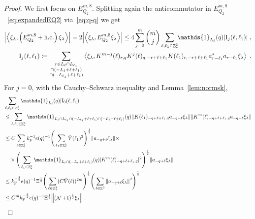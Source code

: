 \documentclass[12pt,a4paper]{article}
\numberwithin{equation}{section}
\newcommand{\1}{\mathbb{I}}
\newcommand{\F}{\mathrm{F}}
\newcommand{\I}{\mathrm{I}}
\DeclareMathOperator{\Z}{\mathbb{Z}}
\DeclareMathOperator{\NN}{\mathcal{N}}
\newcommand{\half}{\frac{1}{2}}
\newcommand{\eva}[1]{\left\langle #1 \right\rangle}
\theoremstyle{plain}
\theoremstyle{definition}
\theoremstyle{remark}
\theoremstyle{plain}
\theoremstyle{definition}
\theoremstyle{remark}
\begin{document}
\begin{proof}
We first focus on $ E^{m,8}_{Q_2} $.
Splitting again the anticommutator in $ E^{m,8}_{Q_2} $~\eqref{eq:expandedEQ2} via~\eqref{eq:q-q} we get
\begin{equation} \label{eq:EQ2181}
\begin{aligned}
	\abs{\eva{\xi_\lambda,\left(E^{m,8}_{Q_2}+\mathrm{h.c.}\right) \xi_\lambda }} 
	= 2\abs{\eva{\xi_\lambda, E^{m,8}_{Q_2} \xi_\lambda }}
	\le 4 \sum_{j=0}^m {{m}\choose j} \sum\limits_{\ell,\ell_1 \in \Z^3_*}\!\! \mathds{1}_{L_\ell}(q) |\I_j(\ell, \ell_1)| \;,\\
	\I_j(\ell, \ell_1)
	\coloneq \sum\limits_{\substack{r\in L_{\ell} \cap L_{\ell_1}\\\cap (-L_{\ell}+\ell+\ell_1) \\ \cap (-L_{\ell_1}+\ell+\ell_1)}}
		\eva{\xi_\lambda, K^{m-j}(\ell)_{r,q} K^{j}(\ell)_{q,-r+\ell+\ell_1} K(\ell_1)_{r,-r+\ell+\ell_1} a^*_{r-\ell_1} a_{r-\ell_1} \xi_\lambda} \;. \\
\end{aligned}
\end{equation}
For $ j = 0 $, with the Cauchy--Schwarz inequality and Lemma~\ref{lem:normsk},
\textcolor{green!30!black}{
\begin{align}
	&\sum_{\ell,\ell_1 \in \Z^3_*} \mathds{1}_{L_\ell}(q) |\I_0(\ell, \ell_1)| \nonumber\\
	&\leq \sum_{\ell,\ell_1 \in \Z^3_*} \mathds{1}_{L_\ell \cap L_{\ell_1} \cap (-L_{\ell_1} + \ell + \ell_1) \cap (-L_\ell + \ell + \ell_1)}(q)
		\norm{ K(\ell_1)_{-q+\ell+\ell_1,q} a_{-q+\ell} \xi_\lambda}
		\norm{ K^m(\ell)_{-q+\ell+\ell_1,q} a_{-q+\ell} \xi_\lambda } \nonumber\\
	&\leq C \sum_{\ell \in \Z^3_*} k_{\F}^{-1} e(q)^{-1}
		\Bigg( \sum_{\ell_1 \in \Z^3_*} \hat{V}(\ell_1)^2 \Bigg)^{\half}
		\norm{ a_{-q+\ell} \xi_\lambda} \times \nonumber\\
	&\quad \times \Bigg( \sum_{\ell_1 \in \Z^3_*} \mathds{1}_{L_\ell \cap (-L_\ell + \ell + \ell_1)}(q) |K^m(\ell)_{-q+\ell+\ell_1,q}|^2 \Bigg)^{\half}
		\norm{ a_{-q+\ell} \xi_\lambda } \nonumber\\
	&\leq k_{\F}^{-\frac 32} e(q)^{-1} \Xi^\half
		\Bigg( \sum_{\ell \in \Z^3_*} (C \hat{V}(\ell))^{2m} \Bigg)^{\half}
		\Bigg( \sum_{\ell \in \Z^3} \norm{a_{-q+\ell} \xi_\lambda }^2 \Bigg)^{\half} \nonumber\\
	&\leq C^m k_{\F}^{-\frac 32} e(q)^{-1} \Xi^{\half} \norm{(\NN+1)^{\half} \xi_\lambda} \;. \label{eq:estEQ2181}
\end{align}
}
\end{proof}
\end{document}
